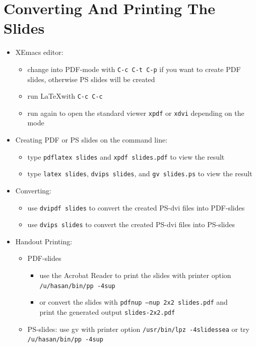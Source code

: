 \documentclass[11pt,a4paper,landscape]{article}
\begin{document}
\NewPage\section{Converting And Printing The Slides}
\secttoc
\begin{itemize}
\item XEmacs editor:
  \begin{itemize}
  \item change into PDF-mode with \texttt{C-c C-t C-p} if you want to create PDF
    slides, otherwise PS slides will be created
  \item run \LaTeX with \texttt{C-c C-c}
  \item run again to open the standard viewer \texttt{xpdf} or \texttt{xdvi}
    depending on the mode
  \end{itemize}
\item Creating PDF or PS slides on the command line:
  \begin{itemize}
  \item type \texttt{pdflatex slides} and \texttt{xpdf slides.pdf} to view the
    result
  \item type \texttt{latex slides}, \texttt{dvips slides}, and \texttt{gv
      slides.ps} to view the result
  \end{itemize}
\item Converting:
  \begin{itemize}
  \item use \texttt{dvipdf slides} to convert the created PS-dvi files into
    PDF-slides
  \item use \texttt{dvips slides} to convert the created PS-dvi files into
    PS-slides
  \end{itemize}
\item Handout Printing:
  \begin{itemize}
  \item PDF-slides
    \begin{itemize}
    \item use the Acrobat Reader to print the slides with printer
      option\\ \texttt{/u/hasan/bin/pp -4sup}
    \item or convert the slides with \texttt{pdfnup --nup 2x2
        slides.pdf} and \\print the generated output
      \texttt{slides-2x2.pdf}
    \end{itemize}
  \item PS-slides: use gv with printer option \texttt{/usr/bin/lpz
      -4slidessea} or try \texttt{/u/hasan/bin/pp -4sup}
  \end{itemize}
\end{itemize}
\end{document}
